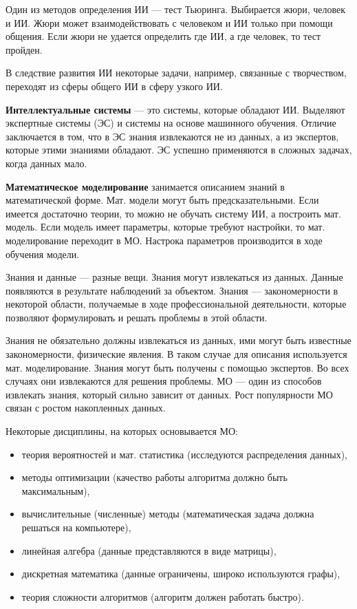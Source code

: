 Один из методов определения ИИ --- тест Тьюринга. Выбирается жюри, человек и
ИИ. Жюри может взаимодействовать с человеком и ИИ только при помощи общения.
Если жюри не удается определить где ИИ, а где человек, то тест пройден.

В следствие развития ИИ некоторые задачи, например, связанные с творчеством,
переходят из сферы общего ИИ в сферу узкого ИИ.

\textbf{Интеллектуальные системы} --- это системы, которые обладают ИИ.
Выделяют экспертные системы (ЭС) и системы на основе машинного обучения.
Отличие заключается в том, что в ЭС знания извлекаются не из данных, а из
экспертов, которые этими знаниями обладают. ЭС успешно применяются в сложных
задачах, когда данных мало.

\textbf{Математическое моделирование} занимается описанием знаний в
математической форме. Мат. модели могут быть предсказательными. Если имеется
достаточно теории, то можно не обучать систему ИИ, а построить мат. модель.
Если модель имеет параметры, которые требуют настройки, то мат. моделирование
переходит в МО. Настрока параметров производится в ходе обучения модели.

Знания и данные --- разные вещи. Знания могут извлекаться из данных. Данные
появляются в результате наблюдений за объектом. Знания --- закономерности в
некоторой области, получаемые в ходе профессиональной деятельности, которые
позволяют формулировать и решать проблемы в этой области.

Знания не обязательно должны извлекаться из данных, ими могут быть известные
закономерности, физические явления. В таком случае для описания используется
мат. моделирование. Знания могут быть получены с помощью экспертов. Во всех
случаях они извлекаются для решения проблемы. МО --- один из способов извлекать
знания, который сильно зависит от данных. Рост популярности МО связан с
ростом накопленных данных.

Некоторые дисциплины, на которых основывается МО:
\begin{itemize}
    \item теория вероятностей и мат. статистика (исследуются распределения
        данных),
    \item методы оптимизации (качество работы алгоритма должно быть
        максимальным),
    \item вычислительные (численные) методы (математическая задача должна
        решаться на компьютере),
    \item линейная алгебра (данные представляются в виде матрицы),
    \item дискретная математика (данные ограничены, широко используются графы),
    \item теория сложности алгоритмов (алгоритм должен работать быстро).
\end{itemize} 

